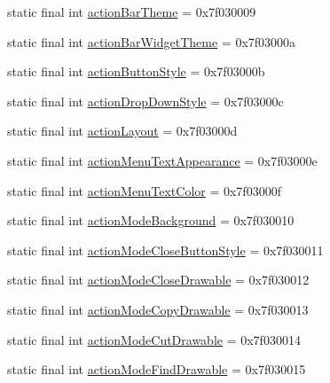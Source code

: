 \begin{DoxyCompactItemize}
static final int \mbox{\hyperlink{classcom_1_1google_1_1android_1_1gms_1_1R_1_1attr_a5e9ffbadf4054936218719ca299b6e21}{action\+Bar\+Theme}} = 0x7f030009
\item 
static final int \mbox{\hyperlink{classcom_1_1google_1_1android_1_1gms_1_1R_1_1attr_a7f858d3af79b42730a92e73a5781de9c}{action\+Bar\+Widget\+Theme}} = 0x7f03000a
\item 
static final int \mbox{\hyperlink{classcom_1_1google_1_1android_1_1gms_1_1R_1_1attr_aec34628cd3a7310a0f40df3e1947c941}{action\+Button\+Style}} = 0x7f03000b
\item 
static final int \mbox{\hyperlink{classcom_1_1google_1_1android_1_1gms_1_1R_1_1attr_a4ed7d1b9a0b56dfbb1508dab5c8d8810}{action\+Drop\+Down\+Style}} = 0x7f03000c
\item 
static final int \mbox{\hyperlink{classcom_1_1google_1_1android_1_1gms_1_1R_1_1attr_a86e3a12700647613e2299a3bb9130a15}{action\+Layout}} = 0x7f03000d
\item 
static final int \mbox{\hyperlink{classcom_1_1google_1_1android_1_1gms_1_1R_1_1attr_a23f41c752d9d5390a60c4049ecbc73e7}{action\+Menu\+Text\+Appearance}} = 0x7f03000e
\item 
static final int \mbox{\hyperlink{classcom_1_1google_1_1android_1_1gms_1_1R_1_1attr_aec0f4b8853153316f1b8b59008047e13}{action\+Menu\+Text\+Color}} = 0x7f03000f
\item 
static final int \mbox{\hyperlink{classcom_1_1google_1_1android_1_1gms_1_1R_1_1attr_a5037e8049ffdec0b9efeca5f12226fd5}{action\+Mode\+Background}} = 0x7f030010
\item 
static final int \mbox{\hyperlink{classcom_1_1google_1_1android_1_1gms_1_1R_1_1attr_a4a0a5315ea8826aa62fda270528e4467}{action\+Mode\+Close\+Button\+Style}} = 0x7f030011
\item 
static final int \mbox{\hyperlink{classcom_1_1google_1_1android_1_1gms_1_1R_1_1attr_a0f073c9858ec041891c9665f869122ca}{action\+Mode\+Close\+Drawable}} = 0x7f030012
\item 
static final int \mbox{\hyperlink{classcom_1_1google_1_1android_1_1gms_1_1R_1_1attr_ab553a193de20e614460f5ea0c3559b1e}{action\+Mode\+Copy\+Drawable}} = 0x7f030013
\item 
static final int \mbox{\hyperlink{classcom_1_1google_1_1android_1_1gms_1_1R_1_1attr_a5f69e073dacdfef25b89a5342cac2a69}{action\+Mode\+Cut\+Drawable}} = 0x7f030014
\item 
static final int \mbox{\hyperlink{classcom_1_1google_1_1android_1_1gms_1_1R_1_1attr_a1719304a5255164941aaa93823fcd798}{action\+Mode\+Find\+Drawable}} = 0x7f030015

\end{DoxyCompactItemize}
